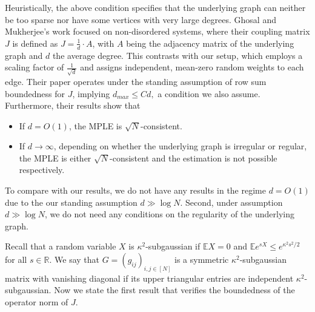 \documentclass[letterpaper,11pt,reqno]{amsart}
\renewcommand{\le}{\leqslant}
\renewcommand{\leq}{\leqslant}
\newcommand{\bP}{\mathbb{P}}\newcommand{\bQ}{\mathbb{Q}}\newcommand{\bR}{\mathbb{R}}
\begin{document}
Heuristically, the above condition specifies that the underlying graph can neither be too sparse nor have some vertices with very large degrees. Ghosal and Mukherjee's work focused on non-disordered systems, where their coupling matrix $J$ is defined as  $J  = \frac{1}{d} \cdot A$, with $A$ being the adjacency matrix of the underlying graph and $d$ the average degree. This contrasts with our setup, which employs a scaling factor of $\frac{1}{\sqrt{d}}$ and assigns independent, mean-zero random weights to each edge. Their paper operates under the standing assumption of row sum boundedness for $J$, implying $d_{max} \le C d,$ a condition we also assume.
    Furthermore, their results  show that 
    \begin{itemize}
        \item[(i)] If $d = O(1)$, the MPLE is $\sqrt{N}$-consistent. 
        \item[(ii)] If $d \to \infty$,  depending on whether the underlying graph is irregular or regular, the MPLE is  either $\sqrt{N}$-consistent and the estimation is not possible respectively. 
    \end{itemize}
    To compare with our results, we do not have any results in the regime $d = O(1)$ due to the our standing assumption $d\gg \log N$. Second, under assumption  $d \gg \log N$, we do not need any conditions on the regularity of the underlying graph. 
    





    








Recall that a random variable $X$ is $\kappa^2$-subgaussian if $\mathbb{E}X=0$ and $\mathbb{E} e^{sX}\leq e^{\kappa^2 s^2/2}$ for all $s\in \mathbb{R}.$ We say that  $G=(g_{ij})_{i,j\in[N]}$ is a symmetric $\kappa^2$-subgaussian matrix with vanishing diagonal if its upper triangular entries are independent $\kappa^2$-subgaussian. Now we state the first result that verifies the boundedness of the operator norm of $J$.


\end{document}
